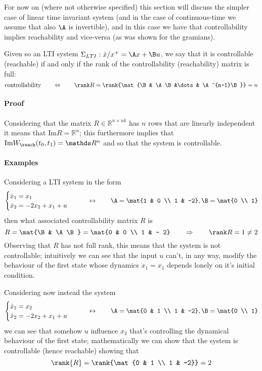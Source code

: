 	For now on (where not otherwise specified) this section will discuss the simpler case of linear time invariant system (and in the case of continuous-time we assume that also $\A$ is invertible), and in this case we have that controllability implies reachability and vice-versa (as was shown for the gramians).
	
	Given so an LTI system $\Sigma_{LTI}: \dot x/x^+ = \A x + \B u$, we say that it is controllable (reachable) if and only if the rank of the controllability (reachability) matrix is full:
	\begin{equation} \label{eq:lin:controllablesystem}
		\textrm{controllability} \qquad \Leftrightarrow \qquad \rank R = \rank{\mat{\B & \A \B &\dots & \A^{n-1}\B}} = n
	\end{equation}

	\paragraph{Proof} Considering that the matrix $R \in \mathds R^{n\times nk}$ has $n$ rows that are linearly independent it means that $\textrm{Im} R = \mathds R^n$; this furthermore implies that $\textrm{Im} W_\reach(t_0,t_1) = \mathds R^n$ and so that the system is controllable.
	
	\paragraph{Examples} Considering a LTI system in the form
	\[ \begin{cases}
		\dot x_1 = x_1 \\ \dot x_2 = -2x_2 + x_1 + u
	\end{cases} \qquad \leftrightarrow \qquad \A= \mat{1 & 0 \\ 1 & -2} , \B = \mat{0 \\ 1} \]
	then what associated controllability matrix $R$ is
	\[ R = \mat{\B & \A \B} = \mat{0 & 0 \\ 1 & - 2} \qquad \Rightarrow \qquad \rank R = 1 \neq 2 \]
	Observing that $R$ has not full rank, this means that the system is not controllable; intuitively we can see that the input $u$ can't, in any way, modify the behaviour of the first state whose dynamics $\dot x_1 = x_1$ depends lonely on it's initial condition.
	
	Considering now instead the system
	\[ \begin{cases}
		\dot x_1 = x_2 \\ \dot x_2 = -2x_2 + x_1 + u
	\end{cases} \qquad \leftrightarrow \qquad \A= \mat{0 & 1 \\ 1 & -2} , \B = \mat{0 \\ 1} \]
	we can see that somehow $u$ influence $x_2$ that's controlling the dynamical behaviour of the first state; mathematically we can show that the system is controllable (hence reachable) showing that
	\[\rank{R} = \rank{\mat{0 & 1 \\ 1 & -2}} = 2\]
	

